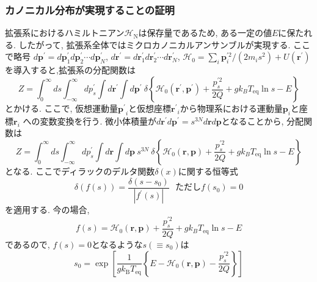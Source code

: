 \subsubsection{カノニカル分布が実現することの証明}
拡張系におけるハミルトニアン$\mathcal{H}_{\mathrm{N}}$は保存量であるため, ある一定の値$E$に保たれる.
したがって, 拡張系全体ではミクロカノニカルアンサンブルが実現する.
ここで略号
$d\bm{p}^{\prime}=d\bm{p}^{\prime}_{1} d\bm{p}^{\prime}_{2} \cdots d\bm{p}^{\prime}_{N}$,
$d\bm{r}^{\prime}=d\bm{r}^{\prime}_{1} d\bm{r}^{\prime}_{2} \cdots d\bm{r}^{\prime}_{N}$,
$\mathcal{H}_{0}=\sum_{i} \bm{p}_{i}^{\prime 2}/(2m_{i} s^2) + U(\bm{r}^{\prime})$
を導入すると,拡張系の分配関数は
\begin{equation}
 Z =
  \int_{0}^{\infty} ds
  \int_{- \infty}^{\infty} dp^{\prime}_{s}
  \int d \bm{r}^{\prime}
  \int d \bm{p}^{\prime} ~
  \delta
  \left\{
    \mathcal{H}_{0} \left(\bm{r}^{\prime}, \bm{p}^{\prime}\right) +
    \frac{p^{\prime 2}_{s}}{2Q} + g k_B T_{\mathrm{eq}} \ln s - E
	\right\}
 \label{eq:NoseHoover14}
\end{equation}
とかける. ここで, 仮想運動量$\bm{p^{\prime}}_{i}$と仮想座標$\bm{r^{\prime}}_{i}$から物理系における運動量$\bm{p}_{i}$と座標$\bm{r}_{i}$
への変数変換を行う.
微小体積量が$d\bm{r}^{\prime} d\bm{p}^{\prime} = s^{3N} d\bm{r} d\bm{p}$となることから, 分配関数は
\begin{equation}
  Z
  = \int_{0}^{\infty} ds \int_{- \infty}^{\infty} dp^{\prime}_{s}
    \int d \bm{r} \int d \bm{p} ~ s^{3N} ~
    \delta \left\{
	    \mathcal{H}_{0} \left(\bm{r}, \bm{p}\right)
	    + \frac{p^{\prime 2}_{s}}{2Q}
	    + g k_B T_{\mathrm{eq}} \ln s - E
	   \right\}
 \label{Eq:Partition-Function-Nose}
\end{equation}
となる. ここでディラックのデルタ関数$\delta (x)$に関する恒等式
\begin{equation}
 \delta\left( f(s) \right)
  = \frac{\delta (s - s_{0})}{| f^{\prime}(s) |} ~~~
  \text{ただし} f(s_{0})=0
 \label{Eq:Delta-Function-IdentityEq}
\end{equation}
を適用する. 今の場合,
\begin{equation}
 f(s)
  = \mathcal{H}_{0} \left(\bm{r}, \bm{p}\right)
  + \frac{p^{\prime 2}_{s}}{2Q}
  + g k_B T_{\mathrm{eq}} \ln s - E
 \label{eq:NoseHoover17}
\end{equation}
であるので, $f(s)=0$となるような$s(\equiv s_{0})$は
\begin{equation}
 s_{0}
  = \exp \left[
	  \frac{1}{g k_{\mathrm{B}} T_{\mathrm{eq}}}
	  \left\{
	   E - \mathcal{H}_{0} \left(\bm{r}, \bm{p} \right)
	   - \frac{p^{\prime 2}_{s}}{2Q}
	  \right\}
	  \right]
 \label{eq:NoseHoover18}
\end{equation}
